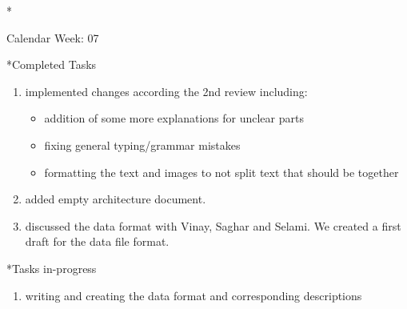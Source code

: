 \documentclass[11pt,a4paper]{article}
\begin{document}
\newpage
\begin{section}*{Calendar Week: 07 \hfill \date{19 February, 2021}}
	
	\begin{subsection}*{Completed Tasks}
		\begin{enumerate}
			\item implemented changes according the 2nd review including:
			\begin{itemize}
				\item addition of some more explanations for unclear parts
				\item fixing general typing/grammar mistakes
				\item formatting the text and images to not split text that should be together
			\end{itemize}
			\item added empty architecture document.
			\item discussed the data format with Vinay, Saghar and Selami. We created a first draft for the data file format.
		\end{enumerate}
	\end{subsection}
	
	\begin{subsection}*{Tasks in-progress}
		\begin{enumerate}
			\item writing and creating the data format and corresponding descriptions
		\end{enumerate}
	\end{subsection}
	
\end{section}
\end{document}
